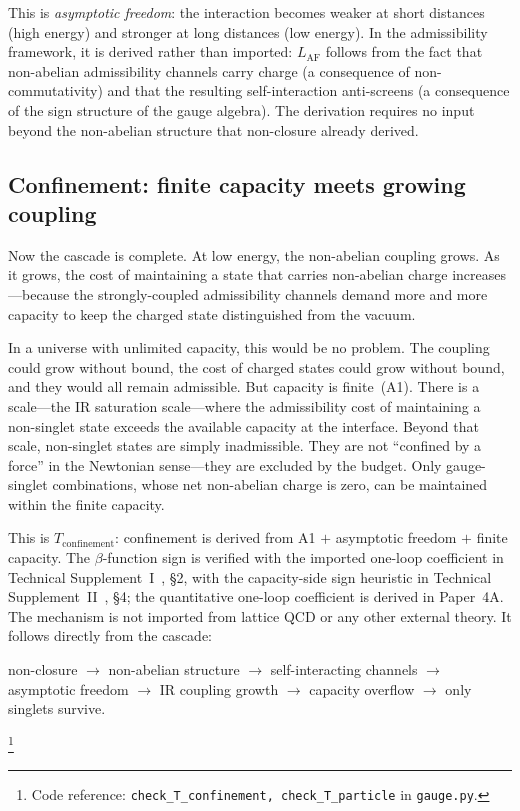 \documentclass[11pt]{article}
\newcommand{\coderef}[2]{\footnote{Code reference: \texttt{#1} in \texttt{#2}.}}
\begin{document}
This is \emph{asymptotic freedom}: the interaction becomes weaker at short distances (high energy) and stronger at long distances (low energy).  In the admissibility framework, it is derived rather than imported: $L_{\mathrm{AF}}$ follows from the fact that non-abelian admissibility channels carry charge (a consequence of non-commutativity) and that the resulting self-interaction anti-screens (a consequence of the sign structure of the gauge algebra).  The derivation requires no input beyond the non-abelian structure that non-closure already derived.

\subsection{Confinement: finite capacity meets growing coupling}

Now the cascade is complete.  At low energy, the non-abelian coupling grows.  As it grows, the cost of maintaining a state that carries non-abelian charge increases---because the strongly-coupled admissibility channels demand more and more capacity to keep the charged state distinguished from the vacuum.

In a universe with unlimited capacity, this would be no problem.  The coupling could grow without bound, the cost of charged states could grow without bound, and they would all remain admissible.  But capacity is finite~(A1).  There is a scale---the IR saturation scale---where the admissibility cost of maintaining a non-singlet state exceeds the available capacity at the interface.  Beyond that scale, non-singlet states are simply inadmissible.  They are not ``confined by a force'' in the Newtonian sense---they are excluded by the budget.  Only gauge-singlet combinations, whose net non-abelian charge is zero, can be maintained within the finite capacity.

This is $T_{\mathrm{confinement}}$: confinement is derived from A1 $+$ asymptotic freedom $+$ finite capacity.  The $\beta$-function sign is verified with the imported one-loop coefficient in Technical Supplement~I~\cite{BrookeP2Supplement}, \S2, with the capacity-side sign heuristic in Technical Supplement~II~\cite{BrookeP2FoundSupplement}, \S4; the quantitative one-loop coefficient is derived in Paper~4A.  The mechanism is not imported from lattice QCD or any other external theory.  It follows directly from the cascade:
\begin{center}
\small
non-closure $\to$ non-abelian structure $\to$ self-interacting channels $\to$ asymptotic freedom $\to$ IR coupling growth $\to$ capacity overflow $\to$ only singlets survive.
\end{center}
\coderef{check\_T\_confinement, check\_T\_particle}{gauge.py}
\end{document}
